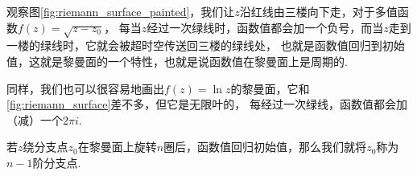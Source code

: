 \documentclass[lang=cn, titlestyle=display, scheme=chinese]{elegantbook}
\begin{document}
                观察图\ref{fig:riemann_surface_painted}，我们让$z$沿红线由三楼向下走，对于多值函数$f(z) = \sqrt{z - z_0}$，
                每当$z$经过一次绿线时，函数值都会加一个负号，而当$z$走到一楼的绿线时，它就会被超时空传送回三楼的绿线处，
                也就是函数值回归到初始值，这就是黎曼面的一个特性，也就是说函数值在黎曼面上是周期的.

                同样，我们也可以很容易地画出$f(z) = \ln{z}$的黎曼面，它和\ref{fig:riemann_surface}差不多，但它是无限叶的，
                每经过一次绿线，函数值都会加（减）一个$2\pi i$.

                \begin{definition}
                    若$z$绕分支点$z_0$在黎曼面上旋转$n$圈后，函数值回归初始值，那么我们就将$z_0$称为$n - 1$阶分支点.
                \end{definition}
\end{document}
